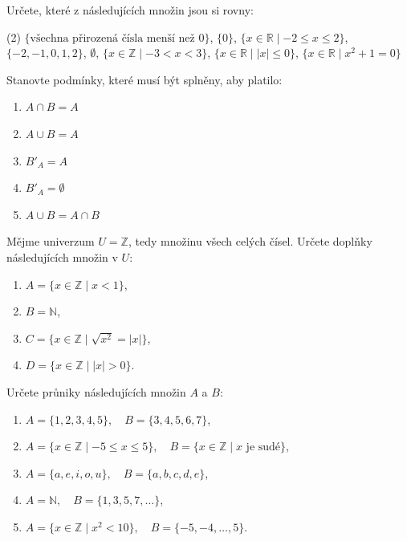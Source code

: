 \documentclass[12pt,a4paper]{article}
\begin{document}
\begin{exercise}
Určete, které z následujících množin jsou si rovny:
\begin{tasks}(2)
    \task $\{ \text{všechna přirozená čísla menší než $0$}\}$,
    \task $\{0\}$,
    \task $\{x \in \mathbb{R} \mid -2 \leq x \leq 2\}$,
    \task $\{-2,-1,0,1,2\}$,
    \task $\emptyset$,
    \task $\{x \in \mathbb{Z} \mid -3 < x < 3\}$,
    \task $\{x \in \mathbb{R} \mid |x| \leq 0\}$,
    \task $\{x \in \mathbb{R} \mid  x^2 + 1 = 0\} $
\end{tasks}
\end{exercise}


\begin{exercise}
Stanovte podmínky, které musí být splněny, aby platilo:
\begin{enumerate}[label=\alph*)]
    \item $A \cap B = A$
    \item $A \cup B = A$
    \item $B'_A = A$
    \item $B'_A=\emptyset$
    \item $A \cup B = A \cap B$
\end{enumerate}
\end{exercise}


\begin{exercise}
Mějme univerzum $U = \mathbb{Z}$, tedy množinu všech celých čísel.  
Určete doplňky následujících množin v $U$:
\begin{enumerate}[label=\alph*)]
    \item $A = \{x \in \mathbb{Z} \mid x < 1\}$,
    \item $B = \mathbb{N}$,
    \item $C = \{x \in \mathbb{Z} \mid \sqrt{x^2} = |x|\}$,
    \item $D = \{x \in \mathbb{Z} \mid |x| > 0\}$.
\end{enumerate}
\end{exercise}


\begin{exercise}
Určete průniky následujících množin $A$ a $B$:
\begin{enumerate}[label=\alph*)]
    \item $A = \{1,2,3,4,5\}, \quad B = \{3,4,5,6,7\}$,
    \item $A = \{x \in \mathbb{Z} \mid -5 \leq x \leq 5\}, \quad B = \{x \in \mathbb{Z} \mid x \text{ je sudé}\}$,
    \item $A = \{a,e,i,o,u\}, \quad B = \{a,b,c,d,e\}$,
    \item $A = \mathbb{N}, \quad B = \{1,3,5,7,\dots\}$,
    \item $A = \{x \in \mathbb{Z} \mid x^2 < 10\}, \quad B = \{-5,-4,\dots,5\}$.
\end{enumerate}
\end{exercise}
\end{document}
